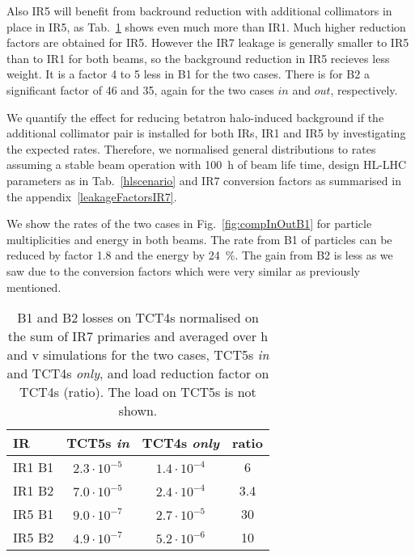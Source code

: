 Also IR5 will benefit from backround reduction with additional collimators in place in IR5, as Tab.~\ref{tab:compLosses} shows even much more than IR1. Much higher reduction factors are obtained for IR5. However the IR7 leakage is generally smaller to IR5 than to IR1 for both beams, so the background reduction in IR5 recieves less weight. It is a factor 4 to 5 less in B1 for the two cases. There is for B2 a significant factor of 46 and 35, again for the two cases $in$ and $out$, respectively.

We quantify the effect for reducing betatron halo-induced background if the additional collimator pair is installed for both IRs, IR1 and IR5 by investigating the expected rates. Therefore, we normalised general distributions to rates assuming a stable beam operation with 100~h of beam life time, design HL-LHC parameters as in Tab.~\ref{hlscenario} and IR7 conversion factors as summarised in the appendix~\ref{leakageFactorsIR7}.

We show the rates of the two cases in Fig.~\ref{fig:compInOutB1} for particle multiplicities and energy in both beams. The rate from B1 of particles can be reduced by factor 1.8 and the energy by 24~\%. The gain from B2 is less as we saw due to the conversion factors which were very similar as previously mentioned.

\begin{table}%
   \centering
   \caption{B1 and B2 losses on TCT4s normalised on the sum of IR7 primaries and averaged over h and v simulations for the two cases, TCT5s \textit{in} and TCT4s \textit{only}, and load reduction factor on TCT4s (ratio). The load on TCT5s is not shown.} 
   \begin{tabular}{l|c|c|c}
       \hline
       IR & TCT5s \textit{in} &  TCT4s \textit{only} & ratio \\
       \hline\hline
       IR1 B1 & $2.3 \cdot 10^{-5}$ & $1.4 \cdot 10^{-4}$ & 6\\
       IR1 B2 & $7.0 \cdot 10^{-5}$ & $2.4 \cdot 10^{-4}$ & 3.4 \\ 
       IR5 B1 & $9.0 \cdot 10^{-7}$ & $2.7 \cdot 10^{-5}$ & 30\\
       IR5 B2 & $4.9 \cdot 10^{-7}$ & $5.2 \cdot 10^{-6}$ & 10\\
       \hline
   \end{tabular}
   \label{tab:compLosses}
\end{table}




